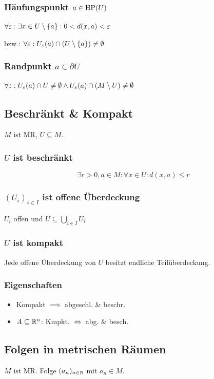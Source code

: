 \subsubsection*{Häufungspunkt $a \in \operatorname{HP}(U)$}
$\forall \varepsilon: \exists x \in U\setminus\{a\}: 0 < d(x,a) < \varepsilon$

bzw.: $\forall \varepsilon: U_\varepsilon(a) \cap (U \setminus \{a\}) \neq \emptyset$

\subsubsection*{Randpunkt $a \in \partial U$}
$\forall \varepsilon: U_\varepsilon(a) \cap U \neq \emptyset \land U_\varepsilon(a) \cap (M \setminus U) \neq \emptyset$

\subsection*{Beschränkt \& Kompakt}
$M$ ist MR, $U \subseteq M$.

\subsubsection*{$U$ ist beschränkt}
\[\exists r>0, a\in M: \forall x\in U: d(x,a) \le r\]

\subsubsection*{$(U_i)_{i\in I}$ ist offene Überdeckung}
$U_i$ offen und $U \subseteq \bigcup_{i\in I} U_i$

\subsubsection*{$U$ ist kompakt}
Jede offene Überdeckung von $U$ besitzt endliche Teilüberdeckung.

\subsubsection*{Eigenschaften}
\begin{itemize}
	\item Kompakt $\implies$ abgeschl. \& beschr.
	\item $A \subseteq \mathbb{R}^n$: Kmpkt. $\Leftrightarrow$ abg. \& besch.
\end{itemize}

\subsection*{Folgen in metrischen Räumen}
$M$ ist MR. Folge $(a_n)_{n\in\mathbb{N}}$ mit $a_n\in M$.

